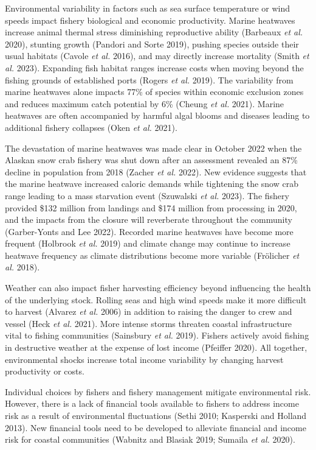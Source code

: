 \documentclass[
  letterpaper,
  DIV=11,
  numbers=noendperiod]{scrartcl}
\theoremstyle{plain}
\theoremstyle{plain}
\theoremstyle{remark}
\begin{document}
Environmental variability in factors such as sea surface temperature or
wind speeds impact fishery biological and economic productivity. Marine
heatwaves increase animal thermal stress diminishing reproductive
ability (Barbeaux \emph{et al.} 2020), stunting growth (Pandori and
Sorte 2019), pushing species outside their usual habitats (Cavole
\emph{et al.} 2016), and may directly increase mortality (Smith \emph{et
al.} 2023). Expanding fish habitat ranges increase costs when moving
beyond the fishing grounds of established ports (Rogers \emph{et al.}
2019). The variability from marine heatwaves alone impacts 77\% of
species within economic exclusion zones and reduces maximum catch
potential by 6\% (Cheung \emph{et al.} 2021). Marine heatwaves are often
accompanied by harmful algal blooms and diseases leading to additional
fishery collapses (Oken \emph{et al.} 2021).

The devastation of marine heatwaves was made clear in October 2022 when
the Alaskan snow crab fishery was shut down after an assessment revealed
an 87\% decline in population from 2018 (Zacher \emph{et al.} 2022). New
evidence suggests that the marine heatwave increased caloric demands
while tightening the snow crab range leading to a mass starvation event
(Szuwalski \emph{et al.} 2023). The fishery provided \$132 million from
landings and \$174 million from processing in 2020, and the impacts from
the closure will reverberate throughout the community (Garber-Yonts and
Lee 2022). Recorded marine heatwaves have become more frequent (Holbrook
\emph{et al.} 2019) and climate change may continue to increase heatwave
frequency as climate distributions become more variable (Frölicher
\emph{et al.} 2018).

Weather can also impact fisher harvesting efficiency beyond influencing
the health of the underlying stock. Rolling seas and high wind speeds
make it more difficult to harvest (Alvarez \emph{et al.} 2006) in
addition to raising the danger to crew and vessel (Heck \emph{et al.}
2021). More intense storms threaten coastal infrastructure vital to
fishing communities (Sainsbury \emph{et al.} 2019). Fishers actively
avoid fishing in destructive weather at the expense of lost income
(Pfeiffer 2020). All together, environmental shocks increase total
income variability by changing harvest productivity or costs.

Individual choices by fishers and fishery management mitigate
environmental risk. However, there is a lack of financial tools
available to fishers to address income risk as a result of environmental
fluctuations (Sethi 2010; Kasperski and Holland 2013). New financial
tools need to be developed to alleviate financial and income risk for
coastal communities (Wabnitz and Blasiak 2019; Sumaila \emph{et al.}
2020).
\end{document}
